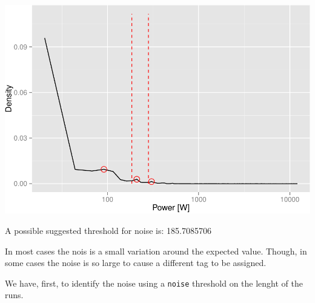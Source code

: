\documentclass[]{article}
\newenvironment{Shaded}{\begin{snugshade}}{\end{snugshade}}
\newcommand{\KeywordTok}[1]{\textcolor[rgb]{0.13,0.29,0.53}{\textbf{{#1}}}}
\newcommand{\DecValTok}[1]{\textcolor[rgb]{0.00,0.00,0.81}{{#1}}}
\newcommand{\StringTok}[1]{\textcolor[rgb]{0.31,0.60,0.02}{{#1}}}
\newcommand{\NormalTok}[1]{{#1}}
\begin{document}
\begin{Shaded}
\end{Shaded}

\includegraphics{AnalysisProcedure_files/figure-latex/noise_density-1.pdf}

A possible suggested threshold for noise is: 185.7085706

In most cases the nois is a small variation around the expected value.
Though, in some cases the noise is so large to cause a different tag to
be assigned.

We have, first, to identify the noise using a \texttt{noise} threshold
on the lenght of the runs.
\end{document}
